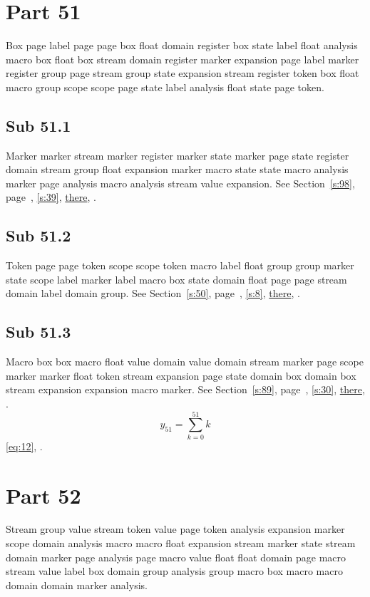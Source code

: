 \documentclass[11pt]{article}
\begin{document}
\section{Part 51}\label{s:51}
Box page label page page box float domain register box state label float analysis macro box float box stream domain register marker expansion page label marker register group page stream group state expansion stream register token box float macro group scope scope page state label analysis float state page token.
\subsection{Sub 51.1}\label{ss:51.1} Marker marker stream marker register marker state marker page state register domain stream group float expansion marker macro state state macro analysis marker page analysis macro analysis stream value expansion. See Section~\ref{s:98}, page~\pageref{ss:38.3}, \cref{s:39}, \hyperref[s:76]{there}, \cite{k98,k81}.
\subsection{Sub 51.2}\label{ss:51.2} Token page page token scope scope token macro label float group group marker state scope label marker label macro box state domain float page page stream domain label domain group. See Section~\ref{s:50}, page~\pageref{ss:38.2}, \cref{s:8}, \hyperref[s:38]{there}, \cite{k100,k45}.
\subsection{Sub 51.3}\label{ss:51.3} Macro box box macro float value domain value domain stream marker page scope marker marker float token stream expansion page state domain box domain box stream expansion expansion macro marker. See Section~\ref{s:89}, page~\pageref{ss:13.2}, \cref{s:30}, \hyperref[s:97]{there}, \cite{k15,k45}.
\begin{equation}y_{51}=\sum_{k=0}^{51}k\label{eq:51}\end{equation} \eqref{eq:12}, .
\section{Part 52}\label{s:52}
Stream group value stream token value page token analysis expansion marker scope domain analysis macro macro float expansion stream marker state stream domain marker page analysis page macro value float float domain page macro stream value label box domain group analysis group macro box macro macro domain domain marker analysis.
\end{document}
